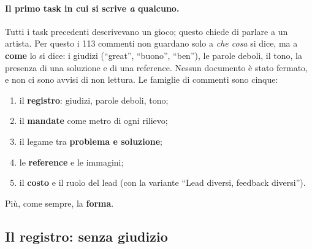 \paragraph{Il primo task in cui si scrive \emph{a} qualcuno.} Tutti i task
precedenti descrivevano un gioco; questo chiede di parlare a un artista. Per
questo i 113 commenti non guardano solo a \emph{che cosa} si dice, ma a
\textbf{come} lo si dice: i giudizi (``great'', ``buono'', ``ben''), le parole
deboli, il tono, la presenza di una soluzione e di una reference. Nessun
documento è stato fermato, e non ci sono avvisi di non lettura. Le famiglie di
commenti sono cinque:
\begin{enumerate}
  \item il \textbf{registro}: giudizi, parole deboli, tono;
  \item il \textbf{mandate} come metro di ogni rilievo;
  \item il legame tra \textbf{problema e soluzione};
  \item le \textbf{reference} e le immagini;
  \item il \textbf{costo} e il ruolo del lead (con la variante ``Lead
        diversi, feedback diversi'').
\end{enumerate}
Più, come sempre, la \textbf{forma}.

\subsection{Il registro: senza giudizio}
\label{rv:t6:sec:giudizio}

